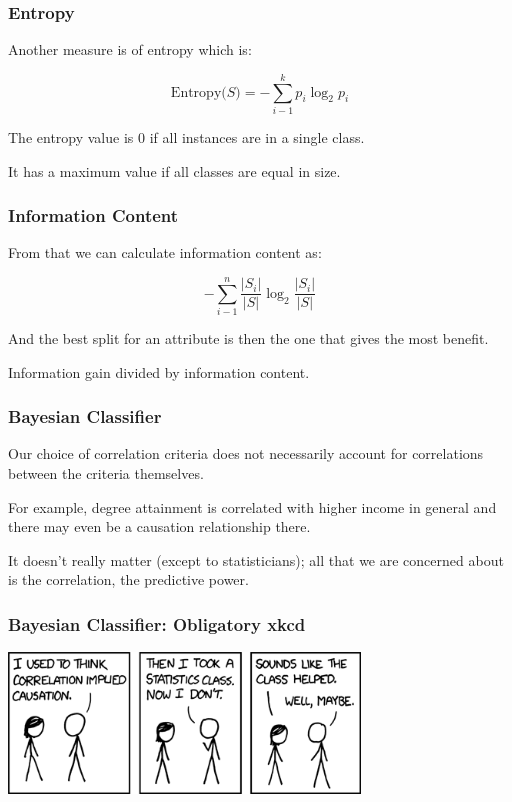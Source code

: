\begin{frame}
\frametitle{Entropy}

Another measure is of entropy which is:

$$\mbox{Entropy($S$)} = - \sum_{i-1}^{k}p_{i} \log_{2} p_{i}$$

The entropy value is 0 if all instances are in a single class. 

It has a maximum value if all classes are equal in size.

\end{frame}

\begin{frame}
\frametitle{Information Content}

From that we can calculate information content as:

$$ - \sum_{i-1}^{n} \dfrac{|S_{i}|}{|S|}  \log_{2} \dfrac{|S_{i}|}{|S|} $$

And the best split for an attribute is then the one that gives the most benefit.

Information gain divided by information content.

\end{frame}

\begin{frame}
\frametitle{Bayesian Classifier}

Our choice of correlation criteria does not necessarily account for correlations between the criteria themselves. 

For example, degree attainment is correlated with higher income  in general and there may even be a causation relationship there.

It doesn't really matter (except to statisticians); all that we are concerned about is the correlation, the predictive power.


\end{frame}


\begin{frame}
\frametitle{Bayesian Classifier: Obligatory xkcd}

\begin{center}
	\includegraphics[width=0.7\textwidth]{images/correlation}
\end{center}


\end{frame}


